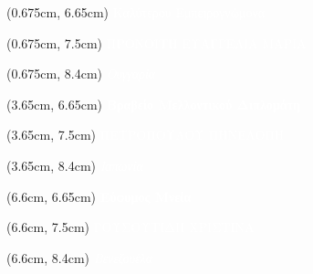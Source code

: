 \documentclass[aspectratio=3219]{beamer}
\begin{document}
{\begin{frame}

\begin{textblock*}{3cm}(0.675cm, 6.65cm)
    \centering
    \textcolor{white}{\tiny {} Καλύτερου Εμπειρογνώμονα \\}
\end{textblock*}

\begin{textblock*}{3cm}(0.675cm, 7.5cm)
    \centering
    \textcolor{white}{\scriptsize ΠΡΟΝΟΪΤΗ ΕΥΑΓΓΕΛΙΑ ΜΑΡΙΑ \\}
\end{textblock*}

\begin{textblock*}{3cm}(0.675cm, 8.4cm)
    \centering
    \textcolor{white}{\tiny \it Ουγγαρία \\}
\end{textblock*}

\begin{textblock*}{2.95cm}(3.65cm, 6.65cm)
    \centering
    \textcolor{white}{\tiny \bf Βραβείο Μελλοντικού Διπλομάτη \\}
\end{textblock*}

\begin{textblock*}{2.95cm}(3.65cm, 7.5cm)
    \centering
    \textcolor{white}{\scriptsize ΠΕΤΡΟΠΟΥΛΟΥ ΠΗΝΕΛΟΠΗ \\}
\end{textblock*}

\begin{textblock*}{2.95cm}(3.65cm, 8.4cm)
    \centering
    \textcolor{white}{\tiny \it Ιαπωνία \\}
\end{textblock*}

\begin{textblock*}{2.95cm}(6.6cm, 6.65cm)
    \centering
    \textcolor{white}{\tiny \bf Εύφυμος Μνεία\\}
\end{textblock*}

\begin{textblock*}{2.95cm}(6.6cm, 7.5cm)
    \centering
    \textcolor{white}{\scriptsize ΓΟΥΣΟΥΤΙΔΗ ΧΡΙΣΤΙΝΑ \\}
\end{textblock*}

\begin{textblock*}{2.95cm}(6.6cm, 8.4cm)
    \centering
    \textcolor{white}{\tiny \it Βενεζουέλα \\}
\end{textblock*}


\end{frame}}
\end{document}
